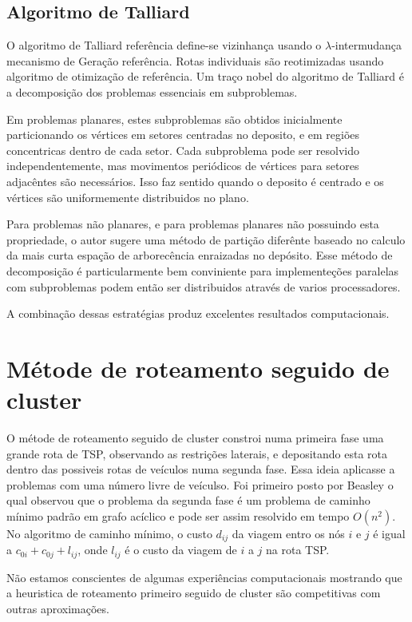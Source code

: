 \subsection{Algoritmo de Talliard}

 O algoritmo de Talliard {\color{red} referência} define-se vizinhança usando o
$\lambda$-intermudança mecanismo de Geração {\color{red} referência}. Rotas individuais são
reotimizadas usando algoritmo de otimização de {\color{red} referência}. Um traço nobel do algoritmo
de Talliard é a decomposição dos problemas essenciais em subproblemas.

 Em problemas planares, estes subproblemas são obtidos inicialmente particionando os vértices em
setores centradas no deposito, e em regiões concentricas dentro de cada setor. Cada subproblema pode
ser resolvido independentemente, mas movimentos periódicos de vértices para setores adjacêntes são
necessários. Isso faz sentido quando o deposito é centrado e os vértices são uniformemente
distribuidos no plano.

 Para problemas não planares, e para problemas planares não possuindo esta propriedade, o autor
sugere uma método de partição diferênte baseado no calculo da mais curta espação de arborecência
enraizadas no depósito. Esse método de decomposição é particularmente bem conviniente para
implementeções paralelas com subproblemas podem então ser distribuidos através de varios
processadores.

 A combinação dessas estratégias produz excelentes resultados computacionais.

\section{Métode de roteamento seguido de cluster}

 O métode de roteamento seguido de cluster constroi numa primeira fase uma grande rota de TSP,
observando as restrições laterais, e depositando esta rota dentro das possiveis rotas de veículos
numa segunda fase. Essa ideia aplicasse a problemas com uma número livre de veículso. Foi primeiro
posto por Beasley o qual observou que o problema da segunda fase é um problema de caminho mínimo
padrão em grafo acíclico e pode ser assim resolvido em tempo $O(n^2)$. No algoritmo de caminho
mínimo, o custo $d_{ij}$ da viagem entro os nós $i$ e $j$ é igual a $c_{0i}+c_{0j}+l_{ij}$, onde
$l_{ij}$ é o custo da viagem de $i$ a $j$ na rota TSP.

 Não estamos conscientes de algumas experiências computacionais mostrando que a heuristica de
roteamento primeiro seguido de cluster são competitivas com outras aproximações.



